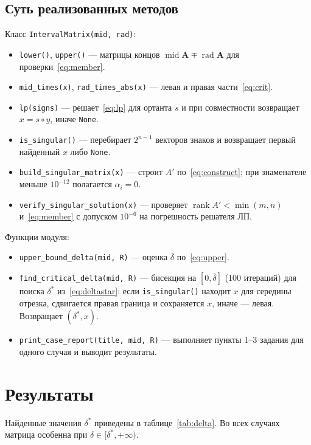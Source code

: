 \documentclass[a4paper, 14pt]{extarticle}
\begin{document}
\subsection{Суть реализованных методов}

Класс \texttt{IntervalMatrix(mid, rad)}:
\begin{itemize}
    \item \texttt{lower()}, \texttt{upper()} --- матрицы концов $\operatorname{mid}\mathbf{A} \mp \operatorname{rad}\mathbf{A}$ для проверки~\eqref{eq:member}.
    \item \texttt{mid\_times(x)}, \texttt{rad\_times\_abs(x)} --- левая и правая части~\eqref{eq:crit}.
    \item \texttt{lp(signs)} --- решает~\eqref{eq:lp} для ортанта $s$ и при совместности возвращает $x = s \circ y$, иначе \texttt{None}.
    \item \texttt{is\_singular()} --- перебирает $2^{n-1}$ векторов знаков и возвращает первый найденный $x$ либо \texttt{None}.
    \item \texttt{build\_singular\_matrix(x)} --- строит $A'$ по~\eqref{eq:construct}; при знаменателе меньше $10^{-12}$ полагается $\alpha_i = 0$.
    \item \texttt{verify\_singular\_solution(x)} --- проверяет $\operatorname{rank} A' < \min(m, n)$ и~\eqref{eq:member} с допуском $10^{-6}$ на погрешность решателя ЛП.
\end{itemize}

Функции модуля:
\begin{itemize}
    \item \texttt{upper\_bound\_delta(mid, R)} --- оценка $\overline{\delta}$ по~\eqref{eq:upper}.
    \item \texttt{find\_critical\_delta(mid, R)} --- бисекция на $[0, \overline{\delta}]$ (100 итераций) для поиска $\delta^*$ из~\eqref{eq:deltastar}: если \texttt{is\_singular()} находит $x$ для середины отрезка, сдвигается правая граница и сохраняется $x$, иначе --- левая. Возвращает $(\delta^*, x)$.
    \item \texttt{print\_case\_report(title, mid, R)} --- выполняет пункты 1--3 задания для одного случая и выводит результаты.
\end{itemize}

\section{Результаты}

Найденные значения $\delta^*$ приведены в таблице~\ref{tab:delta}. Во всех случаях матрица особенна при $\delta \in [\delta^*, +\infty)$.
\end{document}
